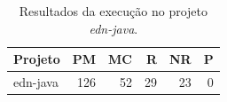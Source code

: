 \begin{table}[ht]
\centering
\caption{Resultados da execução no projeto \textit{edn-java}.}
\label{tab:edn-java}
\begin{tabular}{lrrrrr}
\hline
Projeto & PM & MC & R & NR & P \\
\hline
edn-java & 126 & 52 & 29 & 23 & 0 \\
\hline
\end{tabular}
\end{table}
